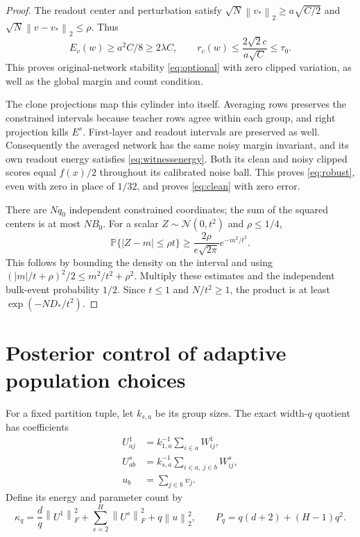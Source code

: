 \documentclass[11pt]{article}
\newcommand{\Prb}{\mathbb P}
\newcommand{\norm}[1]{\left\|#1\right\|}
\begin{document}
\begin{proof}
The readout center and perturbation satisfy
$\sqrt N\norm{v_*}_2\ge a\sqrt{C/2}$ and
$\sqrt N\norm{v-v_*}_2\le\rho$. Thus
\begin{equation}\label{eq:witnessenergy}
 E_v(w)\ge a^2C/8\ge2\lambda C,\qquad
 r_c(w)\le\frac{2\sqrt2c}{a\sqrt C}\le\tau_0.
\end{equation}
This proves original-network stability \eqref{eq:optional} with zero
clipped variation, as well as the global margin and count condition.

The clone projections map this cylinder into itself. Averaging rows
preserves the constrained intervals because teacher rows agree within each
group, and right projection kills $E^s$. First-layer and readout intervals
are preserved as well. Consequently the averaged network has the same
noisy margin invariant, and its own readout energy satisfies
\eqref{eq:witnessenergy}. Both its clean and noisy clipped scores equal
$f(x)/2$ throughout its calibrated noise ball. This proves
\eqref{eq:robust}, even with zero in place of $1/32$, and proves
\eqref{eq:clean} with zero error.

There are $Nq_0$ independent constrained coordinates; the sum of the
squared centers is at most $NB_0$. For a scalar
$Z\sim\mathcal N(0,t^2)$ and $\rho\le1/4$,
\[
 \Prb\{|Z-m|\le\rho t\}\ge
 \frac{2\rho}{e\sqrt{2\pi}}e^{-m^2/t^2}.
\]
This follows by bounding the density on the interval and using
$(|m|/t+\rho)^2/2\le m^2/t^2+\rho^2$.
Multiply these estimates and the independent bulk-event probability
$1/2$. Since $t\le1$ and $N/t^2\ge1$, the product is at least
$\exp(-ND_*/t^2)$.
\end{proof}

\section{Posterior control of adaptive population choices}

For a fixed partition tuple, let $k_{s,a}$ be its group sizes. The exact
width-$q$ quotient has coefficients
\begin{align*}
 U^1_{aj}&=k_{1,a}^{-1}\sum_{i\in a}W^1_{ij},\\
 U^s_{ab}&=k_{s,a}^{-1}\sum_{i\in a,\ j\in b}W^s_{ij},\\
 u_b&=\sum_{j\in b}v_j.
\end{align*}
Define its energy and parameter count by
\[
 \kappa_q=\frac dq\norm{U^1}_F^2+
       \sum_{s=2}^H\norm{U^s}_F^2+q\norm u_2^2,
 \qquad P_q=q(d+2)+(H-1)q^2.
\]
\end{document}
